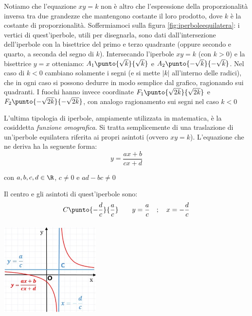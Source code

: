 Notiamo che l'equazione \(xy=k\) non è altro che l'espressione della 
proporzionalità inversa tra due grandezze che mantengono costante il loro 
prodotto, dove \(k\) è la costante di proporzionalità. Soffermiamoci sulla 
figura \ref{fig:iperboleequilatera}: i vertici di quest'iperbole, utili per disegnarla, sono dati 
dall'intersezione dell'iperbole con la bisettrice del primo e terzo 
quadrante (oppure secondo e quarto, a seconda del segno di \(k\)). Intersecando l'iperbole \(xy=k\) (con \(k>0\))
e la bisettrice \(y=x\) otteniamo: \(A_{1} \punto{\sqrt{k}}{\sqrt{k}}\) e 
\(A_{2} \punto{- \sqrt{k}}{-\sqrt{k}}\). Nel caso di \(k<0\) cambiano solamente i segni (e si mette \(|k|\) all'interno delle radici), che in ogni caso
si possono dedurre in modo semplice dal grafico, ragionando sui quadranti. I fuochi hanno invece coordinate
\(F_1 \punto{\sqrt{2k}}{\sqrt{2k}}\) e \(F_2 \punto{-\sqrt{2k}}{-\sqrt{2k}}\), con analogo ragionamento sui segni
nel caso \(k<0\)

\vspace{12pt}

\noindent\begin{minipage}{.6\textwidth}
L'ultima tipologia di iperbole, ampiamente utilizzata in matematica,
è la cosiddetta \emph{funzione omografica}. Si tratta semplicemente di
una traslazione di un'iperbole equilatera riferita ai propri asintoti (ovvero \(xy=k\)).
L'equazione che ne deriva ha la seguente forma:
\begin{equation}
y= \dfrac{ax+b}{cx+d}
\end{equation}

con \(a,b,c,d\in \R\), \(c \neq 0\) e \( ad-bc \neq 0\)

\vspace{6pt}
Il centro e gli asintoti di quest'iperbole sono:
\[C \punto{-\dfrac{d}{c}}{\dfrac{a}{c}} \qquad y= \dfrac{a}{c} \quad; \quad  x=-\dfrac{d}{c}\]
\end{minipage}
\hfill
\begin{minipage}{.35\textwidth}
  \centering
  \includegraphics[height=5cm, width=5cm]{img/omografica.jpg}
\end{minipage}

